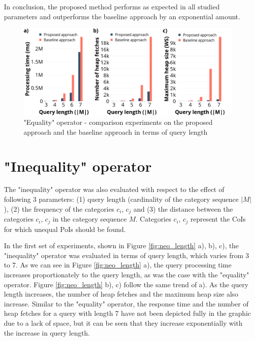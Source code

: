 In conclusion, the proposed method performs as expected in all studied parameters and outperforms the baseline approach by an exponential amount. 

\begin{figure}[H]
	\includegraphics[scale=0.33]{images/eo2_30.png}
	\centering
	\caption{"Equality" operator - comparison experiments on the proposed approach and the baseline approach in terms of query length}
	\label{fig:eo2_length}
\end{figure}


\section{"Inequality" operator}
\label{sec:experimentsNEO}

The "inequality" operator was also evaluated with respect to the effect of following 3 parameters: (1) query length (cardinality of the category sequence $|M|$), (2) the frequency of the categories $c_i$, $c_j$ and (3) the distance between the categories $c_i$, $c_j$ in the category sequence $M$. Categories $c_i$, $c_j$ represent the CoIs for which unequal PoIs should be found.

In the first set of experiments, shown in Figure \ref{fig:neo_length} a), b), c), the "inequality" operator was evaluated in terms of query length, which varies from 3 to 7. As we can see in Figure \ref{fig:neo_length} a), the query processing time increases proportionately to the query length, as was the case with the "equality" operator.  Figure \ref{fig:neo_length} b), c) follow the same trend of a). As the query length increases, the number of heap fetches and the maximum heap size also increase. Similar to the "equality" operator, the response time and the number of heap fetches for a query with length 7 have not been depicted fully in the graphic due to a lack of space, but it can be seen that they increase exponentially with the increase in query length.\newline

